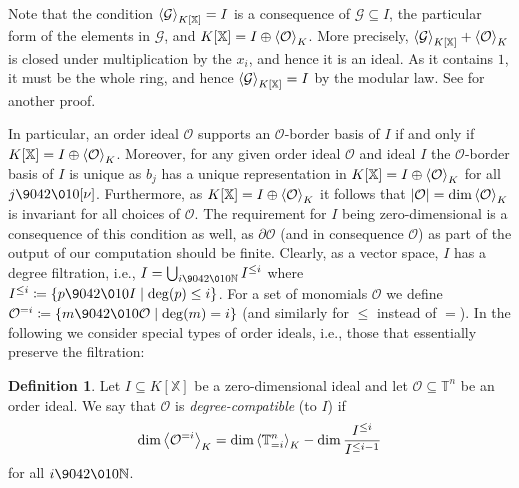 \documentclass[11pt,oneside,english]{amsart}
\makeatletter
\numberwithin{equation}{section}
\numberwithin{figure}{section}
\theoremstyle{plain}
\theoremstyle{definition}
\newtheorem{defn}[thm]{Definition}
\theoremstyle{definition}
\theoremstyle{remark}
\theoremstyle{plain}
\theoremstyle{plain}
\theoremstyle{plain}
\theoremstyle{problem@}
\makeatother
\begin{document}
Note that the condition ${{\left\langle {\mathcal{G}}\right\rangle}\sb{K[\mathbb{X}]}}=I$ is
a consequence of $\mathcal{G}\subseteq I$, the particular form of the
elements in $\mathcal{G}$, and ${K[\mathbb{X}]}=I\oplus{{\left\langle {\mathcal{O}}\right\rangle}\sb{K}}$.
More precisely, \({{\left\langle {\mathcal{G}}\right\rangle}\sb{K[\mathbb{X}]}} + {{\left\langle {\mathcal{O}}\right\rangle}\sb{K}}\) is closed under
multiplication by the \(x_{i}\), and hence it is an ideal.
As it contains \(1\), it must be the whole ring, and hence
${{\left\langle {\mathcal{G}}\right\rangle}\sb{K[\mathbb{X}]}}=I$ by the modular law.
See \cite[Proposition 4.4.2]{kehrein14asv} for another proof.

In particular, an order ideal
${\mathcal{O}}$ supports an ${\mathcal{O}}$-border basis of $I$
if and only if
${K[\mathbb{X}]} = I \oplus {{\left\langle {\mathcal{O}}\right\rangle}\sb{K}}$.
Moreover, for any given order ideal
${\mathcal{O}}$ and ideal $I$ the ${\mathcal{O}}$-border basis of $I$ is unique as
$b_{j}$ has a unique representation in ${K[\mathbb{X}]}=I\oplus{{\left\langle {\mathcal{O}}\right\rangle}\sb{K}}$
for all $j{\9042\010}[\nu]$. Furthermore, as ${K[\mathbb{X}]}=I\oplus{{\left\langle {\mathcal{O}}\right\rangle}\sb{K}}$
it follows that $\lvert {\mathcal{O}} \rvert = \dim {{\left\langle {\mathcal{O}}\right\rangle}\sb{K}} $ is invariant for all
choices of ${\mathcal{O}}$.
The requirement for $I$ being zero-dimensional is a consequence of
this condition as well, as $\partial{\mathcal{O}}$ (and in consequence ${\mathcal{O}}$)
as part of the output of our computation should be finite. Clearly,
as a vector space, $I$ has a degree filtration, i.e., $I=\bigcup_{i{\9042\010}{\mathbb{N}}}I^{\leq i}$
where $I^{\leq i}\coloneqq \{ p{\9042\010} I\mid\deg(p)\leq i \}$. For a set of
monomials ${\mathcal{O}}$ we define ${\mathcal{O}}^{=i}\coloneqq \{m{\9042\010}{\mathcal{O}}\mid\deg(m)=i\}$
(and similarly for $\leq$ instead of \(=\)). In the following we consider special
types of order ideals, i.e., those that essentially preserve the filtration: 
\begin{defn}
\label{def:indepSizes}Let $I\subseteq{K[\mathbb{X}]}$ be a zero-dimensional
ideal and let ${\mathcal{O}}\subseteq{\mathbb{T}}^{n}$ be an order ideal. We say that
${\mathcal{O}}$ is \emph{degree-compatible} (to $I$) if
\[
\dim {{\left\langle {{\mathcal{O}}^{=i}}\right\rangle}\sb{K}} =\dim {{\left\langle {{\mathbb{T}}_{=i}^{n}}\right\rangle}\sb{K}} -\dim \frac{I^{\leq i}}{I^{\leq i-1}} \]
for all $i{\9042\010}{\mathbb{N}}$. 
\end{defn}
\end{document}
